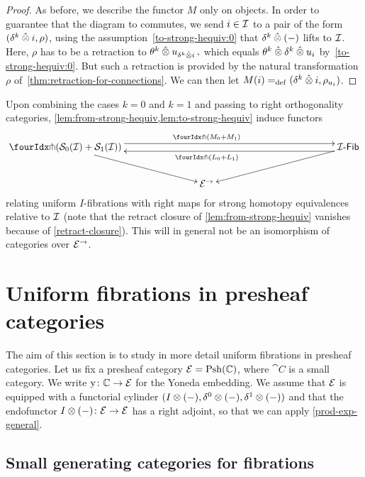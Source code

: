 \documentclass[reqno,10pt,a4paper,oneside,draft]{amsart}
\begin{document}
\begin{proof}
As before, we describe the functor $M$ only on objects.
In order to guarantee that the diagram to commutes, we send $i \in \cal{I}$ to a pair of the form $(\kcyl \hatotimes i, \rho)$, using the assumption~\eqref{to-strong-hequiv:0} that $\kcyl \hatotimes (-)$ lifts to $\cal{I}$.
Here, $\rho$ has to be a retraction to $\thetak \hatotimes u_{\kcyl \hatotimes i}\, ,$ which equals $\thetak \hatotimes \kcyl \hatotimes u_i$ by~\eqref{to-strong-hequiv:0}.
But such a retraction is provided by the natural transformation $\rho$ of~\cref{thm:retraction-for-connections}.
We can then let $M(i) \defeq (\kcyl \hatotimes i, \rho_{u_i})$.
\end{proof}

\begin{remark} \label{relating-strong-hequiv-and-uniform-fib}
Upon combining the cases $k = 0$ and $k = 1$ and passing to right orthogonality categories, \cref{lem:from-strong-hequiv,lem:to-strong-hequiv} induce functors
\[
\xymatrix@!C{
  \liftr{(\cal{S}_0(\cal{I}) + \cal{S}_1(\cal{I}))}
  \ar[dr]
  \ar@<4pt>[rr]^{\liftr{(M_0 + M_1)}}
&&
  \Fib[\cal{I}]
  \ar[dl]
  \ar@<4pt>[ll]^{\liftr{(L_0 + L_1)}}
\\&
  \catE^\to
}
\]
relating uniform $I$-fibrations with right maps for strong homotopy equivalences relative to $\cal{I}$ (note that the retract closure of \cref{lem:from-strong-hequiv} vanishes because of \cref{retract-closure}).
This will in general not be an isomorphism of categories over $\catE^\to$.
\end{remark}


\section{Uniform fibrations in presheaf categories}
\label{sec:unifpc}

The aim of this section is to study in more detail uniform fibrations in presheaf categories.
Let us fix a presheaf category $\catE = \Psh(\cat{C})$, where $\cat{C}$ is a small category.
We write $\yon \co \catC \to \catE$ for the Yoneda embedding.
We assume that $\catE$ is equipped with a functorial cylinder $( \interval \otimes (-), \lcyl \otimes (-), \rcyl \otimes (-))$ and that the endofunctor $ \interval\otimes (-) \co \catE \to \catE$ has a right adjoint, so that we can apply \cref{prod-exp-general}.

\subsection*{Small generating categories for fibrations}
\end{document}
